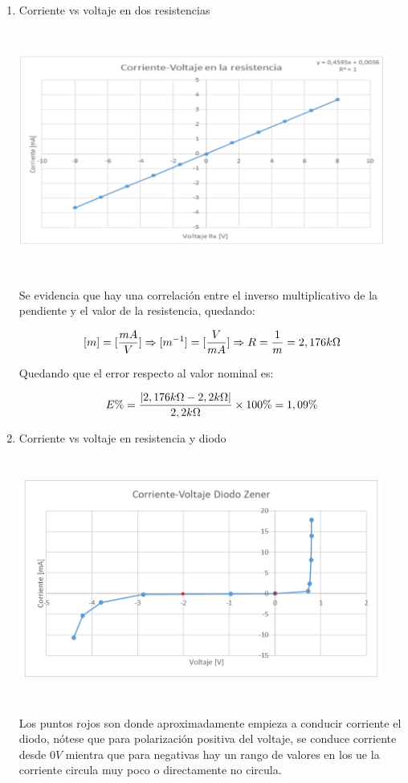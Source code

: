 \documentclass[12pt]{article}
\begin{document}
	\begin{enumerate}
		\item Corriente vs voltaje en dos resistencias
		
		\includegraphics[width=12cm,height=8cm]{Img/graph_1}
		
		\noindent Se evidencia que hay una correlación entre el inverso multiplicativo de la pendiente y el valor de la resistencia, quedando:
		
		\begin{equation}
			\notag [m] = [\frac{mA}{V}] \Rightarrow [m^{-1}] = [\frac{V}{mA}] \Rightarrow R = \frac{1}{m} =  2,176k \Omega
		\end{equation}
		
		\noindent Quedando que el error respecto al valor nominal es:
		
		\begin{equation}
			\notag E\% = \frac{|2,176k\Omega - 2,2k\Omega|}{2,2k\Omega}\times 100\% = 1,09\% 
		\end{equation}
		
		\newpage
		
		\item Corriente vs voltaje en resistencia y diodo
		
		\includegraphics[width=12cm,height=8cm]{Img/graph_2}
		
		\noindent Los puntos rojos son donde aproximadamente empieza a conducir corriente el diodo, nótese que para polarización positiva del voltaje, se conduce corriente desde $0V$ mientra que para negativas hay un rango de valores en los ue la corriente circula muy poco o directamente no circula.
		
	\end{enumerate}
	
\end{document}
